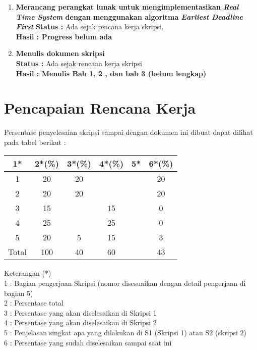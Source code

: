 \documentclass[a4paper,twoside]{article}
\begin{document}
\begin{enumerate}
		\item \textbf{Merancang perangkat lunak untuk mengimplementasikan {\it Real Time System} dengan menggunakan algoritma {\it Earliest Deadline First}}
		{\bf Status :} Ada sejak rencana kerja skripsi.\\
		{\bf Hasil : Progress belum ada} 
		
		\item \textbf{Menulis dokumen skripsi}\\
		{\bf Status :} Ada sejak rencana kerja skripsi\\
		{\bf Hasil : Menulis Bab 1, 2 , dan bab 3 (belum lengkap)} 
		

	\end{enumerate}

\section{Pencapaian Rencana Kerja}
Persentase penyelesaian skripsi sampai dengan dokumen ini dibuat dapat dilihat pada tabel berikut :

\begin{center}
  \begin{tabular}{ | c | c | c | c | l | c |}
    \hline
    1*  & 2*(\%) & 3*(\%) & 4*(\%) &5* &6*(\%)\\ \hline \hline
    1   & 20  & 20  &  &  & 20 \\ \hline
    2   & 20 & 20  &   &  & 20 \\ \hline
    3   & 15  &   & 15 &  & 0 \\ \hline
    4   & 25  &   &  25 &  & 0 \\ \hline
    5   & 20  & 5  & 15 &  & 3 \\ \hline
    Total  & 100  & 40  & 60 &  & 43\\ \hline
                          \end{tabular}
\end{center}

Keterangan (*)\\
1 : Bagian pengerjaan Skripsi (nomor disesuaikan dengan detail pengerjaan di bagian 5)\\
2 : Persentase total \\
3 : Persentase yang akan diselesaikan di Skripsi 1 \\
4 : Persentase yang akan diselesaikan di Skripsi 2 \\
5 : Penjelasan singkat apa yang dilakukan di S1 (Skripsi 1) atau S2 (skripsi 2)\\
6 : Persentase yang sudah diselesaikan sampai saat ini 
\end{document}
